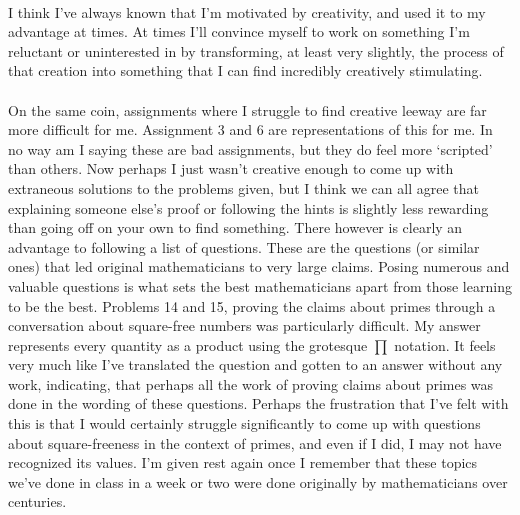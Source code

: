 \documentclass[12pt]{article}
\numberwithin{equation}{section}
\begin{document}
    \paragraph{} I think I've always known that I'm motivated by creativity, and used it to my advantage at times. At times I'll convince myself to work on something I'm reluctant or uninterested in by transforming, at least very slightly, the process of that creation into something that I can find incredibly creatively stimulating.
    \paragraph{} On the same coin, assignments where I struggle to find creative leeway are far more difficult for me. Assignment 3 and 6 are representations of this for me. In no way am I saying these are bad assignments, but they do feel more `scripted' than others. Now perhaps I just wasn't creative enough to come up with extraneous solutions to the problems given, but I think we can all agree that explaining someone else's proof or following the hints is slightly less rewarding than going off on your own to find something. There however is clearly an advantage to following a list of questions. These are the questions (or similar ones) that led original mathematicians to very large claims. Posing numerous and valuable questions is what sets the best mathematicians apart from those learning to be the best. Problems 14 and 15,
    proving the claims about primes through a conversation about square-free numbers was particularly difficult. My answer represents every quantity as a product using the grotesque $\prod$ notation. It feels very much like I've translated the question and gotten to an answer without any work, indicating, that perhaps all the work of proving claims about primes was done in the wording of these questions. Perhaps the frustration that I've felt with this is that I would certainly struggle significantly to come up with questions about square-freeness in the context of primes, and even if I did, I may not have recognized its values. I'm given rest again once I remember that these topics we've done in class in a week or two were done originally by mathematicians over centuries.
\end{document}
